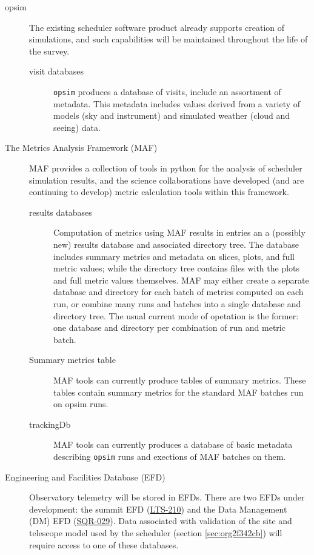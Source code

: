 \begin{description}
\item[{opsim}] The existing scheduler software product already supports creation of simulations, and such capabilities will be maintained throughout the life of the survey.
\begin{description}
\item[{visit databases}] \texttt{opsim} produces a database of visits, include an assortment of metadata. This metadata includes values derived from a variety of models (sky and instrument) and simulated weather (cloud and seeing) data.
\end{description}
\item[{The Metrics Analysis Framework (MAF)}] MAF provides a collection of tools in python for the analysis of scheduler simulation results, and the science collaborations have developed (and are continuing to develop) metric calculation tools within this framework. 
\begin{description}
\item[{results databases}] Computation of metrics using MAF results in entries an a (possibly new) results database and associated directory tree. The database includes summary metrics and metadata on slices, plots, and full metric values; while the directory tree contains files with the plots and full metric values themselves. MAF may either create a separate database and directory for each batch of metrics computed on each run, or combine many runs and batches into a single database and directory tree. The usual current mode of opetation is the former: one database and directory per combination of run and metric batch.
\item[{Summary metrics table}] MAF tools can currently produce tables of summary metrics. These tables contain summary metrics for the standard MAF batches run on opsim runs.
\item[{trackingDb}] MAF tools can currently produces a database of basic metadata describing \texttt{opsim} runs and exections of MAF batches on them.
\end{description}
\item[{Engineering and Facilities Database (EFD)}] Observatory telemetry will be stored in EFDs. There are two EFDs under development: the summit EFD (\href{https://ls.st/LTS-210}{LTS-210}) and the Data Management (DM) EFD (\href{https://sqr-029.lsst.io/}{SQR-029}).  Data associated with validation of the site and telescope model used by the scheduler (section \ref{sec:org2f342cb}) will require access to one of these databases.

\end{description}
